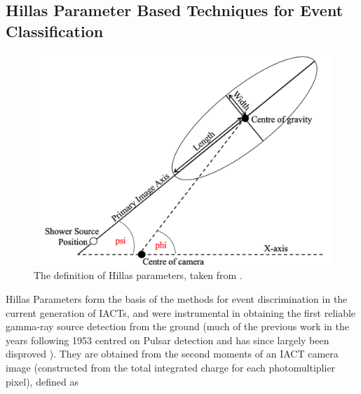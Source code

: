 \subsection{Hillas Parameter Based Techniques for Event Classification}
\begin{figure}[ht] 
        \centering \includegraphics[width=\columnwidth]{figures/hillas.png}
        \caption{
                \label{fig:hillas} %
                The definition of Hillas parameters, taken from \cite{ctapipe}.
        }
\end{figure}
Hillas Parameters form the basis of the methods for event discrimination in the current generation of IACTs, and were instrumental in obtaining the first reliable gamma-ray source detection from the ground \cite{whipple} (much of the previous work in the years following 1953 centred on Pulsar detection and has since largely been disproved \cite{paulathesis}). They are obtained \cite{tomthesis} \cite{weekestev} from the second moments of an IACT camera image (constructed from the total integrated charge for each photomultiplier pixel), defined as 
